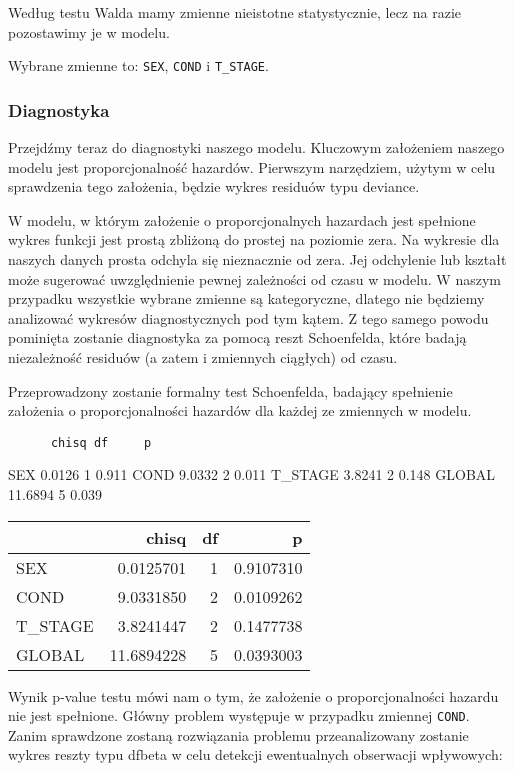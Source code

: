 \documentclass[
]{article}
\begin{document}
Według testu Walda mamy zmienne nieistotne statystycznie, lecz na razie
pozostawimy je w modelu.

Wybrane zmienne to: \texttt{SEX}, \texttt{COND} i \texttt{T\_STAGE}.

\hypertarget{diagnostyka}{%
\subsubsection{Diagnostyka}\label{diagnostyka}}

Przejdźmy teraz do diagnostyki naszego modelu. Kluczowym założeniem
naszego modelu jest proporcjonalność hazardów. Pierwszym narzędziem,
użytym w celu sprawdzenia tego założenia, będzie wykres residuów typu
deviance.

W modelu, w którym założenie o proporcjonalnych hazardach jest spełnione
wykres funkcji jest prostą zbliżoną do prostej na poziomie zera. Na
wykresie dla naszych danych prosta odchyla się nieznacznie od zera. Jej
odchylenie lub kształt może sugerować uwzględnienie pewnej zależności od
czasu w modelu. W naszym przypadku wszystkie wybrane zmienne są
kategoryczne, dlatego nie będziemy analizować wykresów diagnostycznych
pod tym kątem. Z tego samego powodu pominięta zostanie diagnostyka za
pomocą reszt Schoenfelda, które badają niezależność residuów (a zatem i
zmiennych ciągłych) od czasu.

Przeprowadzony zostanie formalny test Schoenfelda, badający spełnienie
założenia o proporcjonalności hazardów dla każdej ze zmiennych w modelu.

\begin{verbatim}
      chisq df     p
\end{verbatim}

SEX 0.0126 1 0.911 COND 9.0332 2 0.011 T\_STAGE 3.8241 2 0.148 GLOBAL
11.6894 5 0.039

\begin{longtable}[]{@{}lrrr@{}}
\toprule
& chisq & df & p \\
\midrule
\endhead
SEX & 0.0125701 & 1 & 0.9107310 \\
COND & 9.0331850 & 2 & 0.0109262 \\
T\_STAGE & 3.8241447 & 2 & 0.1477738 \\
GLOBAL & 11.6894228 & 5 & 0.0393003 \\
\bottomrule
\end{longtable}

Wynik p-value testu mówi nam o tym, że założenie o proporcjonalności
hazardu nie jest spełnione. Główny problem występuje w przypadku
zmiennej \texttt{COND}. Zanim sprawdzone zostaną rozwiązania problemu
przeanalizowany zostanie wykres reszty typu dfbeta w celu detekcji
ewentualnych obserwacji wpływowych:
\end{document}
